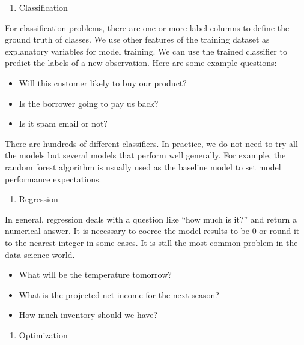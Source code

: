 \documentclass[
  12pt,
]{krantz}
\providecommand{\tightlist}{%
  \setlength{\itemsep}{0pt}\setlength{\parskip}{0pt}}
\begin{document}
\begin{enumerate}
\def\labelenumi{\arabic{enumi}.}
\setcounter{enumi}{3}
\tightlist
\item
  Classification
\end{enumerate}

For classification problems, there are one or more label columns to define the ground truth of classes. We use other features of the training dataset as explanatory variables for model training. We can use the trained classifier to predict the labels of a new observation. Here are some example questions:

\begin{itemize}
\tightlist
\item
  Will this customer likely to buy our product?
\item
  Is the borrower going to pay us back?
\item
  Is it spam email or not?
\end{itemize}

There are hundreds of different classifiers. In practice, we do not need to try all the models but several models that perform well generally. For example, the random forest algorithm is usually used as the baseline model to set model performance expectations.

\begin{enumerate}
\def\labelenumi{\arabic{enumi}.}
\setcounter{enumi}{4}
\tightlist
\item
  Regression
\end{enumerate}

In general, regression deals with a question like ``how much is it?'' and return a numerical answer. It is necessary to coerce the model results to be 0 or round it to the nearest integer in some cases. It is still the most common problem in the data science world.

\begin{itemize}
\tightlist
\item
  What will be the temperature tomorrow?
\item
  What is the projected net income for the next season?
\item
  How much inventory should we have?
\end{itemize}

\begin{enumerate}
\def\labelenumi{\arabic{enumi}.}
\setcounter{enumi}{5}
\tightlist
\item
  Optimization
\end{enumerate}
\end{document}
